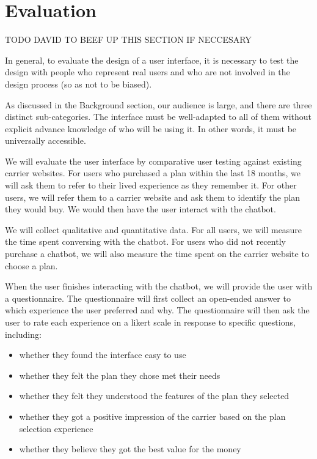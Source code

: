 \documentclass[conference]{IEEEtran}
\begin{document}
\section{Evaluation}

TODO DAVID TO BEEF UP THIS SECTION IF NECCESARY

In general, to evaluate the design of a user interface, it is necessary to
test the design with people who represent real users and who are not involved
in the design process (so as not to be biased).

As discussed in the Background section, our audience is large, and there are
three distinct sub-categories. The interface must be well-adapted to all of
them without explicit advance knowledge of who will be using it. In other
words, it must be universally accessible.

We will evaluate the user interface by comparative user testing against
existing carrier websites. For users who purchased a plan within the last
18 months, we will ask them to refer to their lived experience as they
remember it. For other users, we will refer them to a carrier website and ask
them to identify the plan they would buy. We would then have the user interact
with the chatbot.

We will collect qualitative and quantitative data. For all users, we will
measure the time spent conversing with the chatbot. For users who did not
recently purchase a chatbot, we will also measure the time spent on the carrier
website to choose a plan.

When the user finishes interacting with the chatbot, we will provide the user
with a questionnaire. The questionnaire will first collect an open-ended answer
to which experience the user preferred and why. The questionnaire will then
ask the user to rate each experience on a likert scale in response to
specific questions, including:

\begin{itemize}
    \item whether they found the interface easy to use
    \item whether they felt the plan they chose met their needs
    \item whether they felt they understood the features of the plan they
          selected
    \item whether they got a positive impression of the carrier based on the
          plan selection experience
    \item whether they believe they got the best value for the money
\end{itemize}
\end{document}
